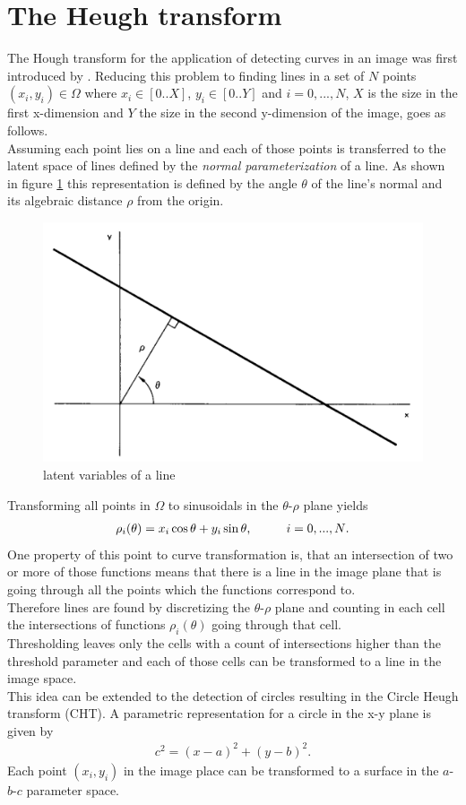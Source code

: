 \section{The Heugh transform}\label{ssec:heugh_tf}
The Hough transform for the application of detecting curves in an image was first introduced by \cite{10.1145/361237.361242}. Reducing this problem to finding lines in a set of $N$ points $(x_i, y_i)\in \Omega$ where $x_i\in [0..X]$, $y_i\in [0..Y]$ and $i = 0, ...,N$, $X$ is the size in the first x-dimension and $Y$ the size in the second y-dimension of the image, goes as follows.\\
Assuming each point lies on a line and each of those points is transferred to the latent space of lines defined by the \emph{normal parameterization} of a line. As shown in figure \ref{fig:norm_line} this representation is defined by the angle $\theta$ of the line's normal and its algebraic distance $\rho$ from the origin.\\

\begin{figure}[ht!]
	\centering
	\includegraphics[width=.5\textwidth]{figures/heugh_line.png}
	\caption{\cite{10.1145/361237.361242} latent variables of a line}
	\label{fig:norm_line}
\end{figure}

Transforming all points in $\Omega$ to sinusoidals in the $\theta$-$\rho$ plane yields
\begin{align}
	\rho_i(\theta) = x_i \cos \theta + y_i \sin \theta \text{, \hspace{8mm} $i = 0, ...,N$}.
\end{align}
One property of this point to curve transformation is, that an intersection of two or more of those functions means that there is a line in the image plane that is going through all the points which the functions correspond to.\\
Therefore lines are found by discretizing the $\theta$-$\rho$ plane and counting in each cell the intersections of functions $\rho_i(\theta)$ going through that cell.\\
Thresholding leaves only the cells with a count of intersections higher than the threshold parameter and each of those cells can be transformed to a line in the image space.\\
This idea can be extended to the detection of circles resulting in the Circle Heugh transform (CHT). A parametric representation for a circle in the x-y plane is given by 
\begin{align}
	c^2 = (x-a)^2 + (y-b)^2.
\end{align}
Each point $(x_i, y_i)$ in the image place can be transformed to a surface in the $a$-$b$-$c$ parameter space.

